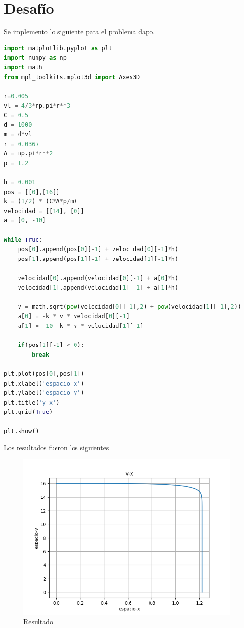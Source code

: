 \documentclass{article}
\begin{document}
\section{Desafío}
Se implemento lo siguiente para el problema dapo.
\begin{lstlisting}[language=Python,caption=Desafío 1.1]
import matplotlib.pyplot as plt
import numpy as np
import math
from mpl_toolkits.mplot3d import Axes3D

r=0.005
vl = 4/3*np.pi*r**3
C = 0.5
d = 1000
m = d*vl
r = 0.0367
A = np.pi*r**2
p = 1.2

h = 0.001
pos = [[0],[16]]
k = (1/2) * (C*A*p/m)
velocidad = [[14], [0]]
a = [0, -10]

while True:
    pos[0].append(pos[0][-1] + velocidad[0][-1]*h)
    pos[1].append(pos[1][-1] + velocidad[1][-1]*h)

    velocidad[0].append(velocidad[0][-1] + a[0]*h)
    velocidad[1].append(velocidad[1][-1] + a[1]*h)

    v = math.sqrt(pow(velocidad[0][-1],2) + pow(velocidad[1][-1],2))
    a[0] = -k * v * velocidad[0][-1]
    a[1] = -10 -k * v * velocidad[1][-1]

    if(pos[1][-1] < 0):
        break

plt.plot(pos[0],pos[1])
plt.xlabel('espacio-x')
plt.ylabel('espacio-y')
plt.title('y-x')
plt.grid(True)

plt.show()
\end{lstlisting}
Los resultados fueron los siguientes
\begin{figure}[H]
    \centering
    \includegraphics[width=1\textwidth]{3_1.png}
    \caption{Resultado}
\end{figure}
\end{document}
